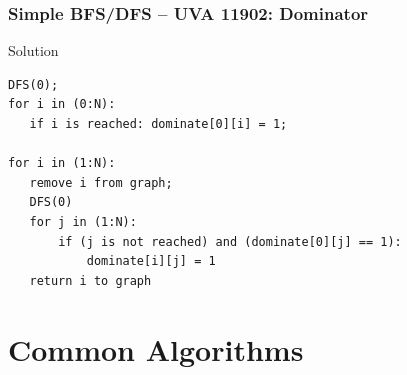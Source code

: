 \documentclass{beamer}
\begin{document}
\begin{frame}
  \frametitle{Simple BFS/DFS -- UVA 11902: Dominator}
  
  {\smaller
  \begin{exampleblock}{Solution}
\begin{verbatim}
DFS(0); 
for i in (0:N): 
   if i is reached: dominate[0][i] = 1;

for i in (1:N):
   remove i from graph;
   DFS(0)
   for j in (1:N):
       if (j is not reached) and (dominate[0][j] == 1):
           dominate[i][j] = 1
   return i to graph

\end{verbatim}
  \end{exampleblock}}
  
  \begin{center}
  \end{center}
\end{frame}

\section{Common Algorithms}
\end{document}
